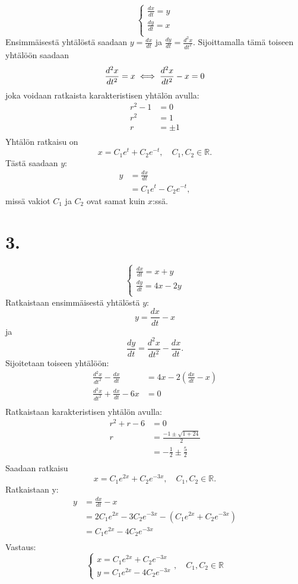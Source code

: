 \documentclass{article}
\begin{document}
\[
  \begin{cases}
    \frac{dx}{dt} = y \\
    \frac{dy}{dt} = x \\
  \end{cases}
\]
Ensimmäisestä yhtälöstä saadaan $y = \frac{dx}{dt}$ ja $\frac{dy}{dt} = \frac{d^2 x}{d t^2}$.
Sijoittamalla tämä toiseen yhtälöön saadaan
\[
  \frac{d^2 x}{d t^2} = x \iff \frac{d^2 x}{d t^2} - x = 0 \\
\]
joka voidaan ratkaista karakteristisen yhtälön avulla:
\begin{align*}
  r^2 - 1 &= 0 \\
  r^2 &= 1 \\
  r &= \pm 1 \\
\end{align*}
Yhtälön ratkaisu on
\[
  x = C_1e^t + C_2e^{-t}, \quad C_1,C_2 \in \mathbb{R}.
\]
Tästä saadaan $y$:
\begin{align*}
  y &= \frac{dx}{dt} \\
    &= C_1e^t - C_2e^{-t},
\end{align*}
missä vakiot $C_1$ ja $C_2$ ovat samat kuin $x$:ssä.

\section*{3.}

\[
  \begin{cases}
    \frac{dx}{dt} = x + y \\
    \frac{dy}{dt} = 4x - 2y \\
  \end{cases}
\]
Ratkaistaan ensimmäisestä yhtälöstä $y$:
\[
  y = \frac{dx}{dt} - x
\]
ja
\[
  \frac{dy}{dt} = \frac{d^2 x}{d t^2} - \frac{dx}{dt}.
\]
Sijoitetaan toiseen yhtälöön:
\begin{align*}
  \frac{d^2 x}{d t^2} - \frac{dx}{dt} &= 4x - 2(\frac{dx}{dt} - x) \\
  \frac{d^2 x}{d t^2} + \frac{dx}{dt} - 6x &= 0 \\
\end{align*}
Ratkaistaan karakteristisen yhtälön avulla:
\begin{align*}
  r^2 + r - 6 &= 0 \\
  r &= \frac{-1 \pm \sqrt{1 + 24}}{2} \\
    &= -\frac{1}{2} \pm \frac{5}{2} \\
\end{align*}
Saadaan ratkaisu
\[
  x = C_1e^{2x} + C_2e^{-3x}, \quad C_1,C_2 \in \mathbb{R}.
\]
Ratkaistaan y:
\begin{align*}
  y &= \frac{dx}{dt} - x \\
    &= 2C_1e^{2x} - 3C_2e^{-3x} - (C_1e^{2x} + C_2e^{-3x}) \\
    &= C_1e^{2x} - 4C_2e^{-3x} \\
\end{align*}
Vastaus:
\[
  \begin{cases}
    x = C_1e^{2x} + C_2e^{-3x} \\
    y = C_1e^{2x} - 4C_2e^{-3x}
  \end{cases},
  \quad C_1,C_2 \in \mathbb{R}
\]
\end{document}
